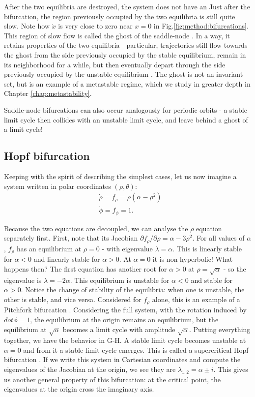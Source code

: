 After the two equilibria are destroyed, the system does not have an
Just after the bifurcation, the region previously occupied by the two equilibria is still quite slow. Note how $\dot{x}$ is very close to zero near $x=0$ in Fig.\ref{fig:method:bifurcations}. This region of slow flow is called the ghost of the saddle-node \cite{strogatz2002nonlinear}. In a way, it retains properties of the two equilibria - particular, trajectories still flow towards the ghost from the side previously occupied by the stable equilibrium, remain in its neighborhood for a while, but then eventually depart through the side previously occupied by the unstable equilibrium \cite{koch2024ghost}. The ghost is not an invariant set, but is an example of a metastable regime, which we study in greater depth in Chapter \ref{chap:metastability}.


Saddle-node bifurcations can also occur analogously for periodic orbits \cite{kuznetsov} - a stable limit cycle then collides with an unstable limit cycle, and leave behind a ghost of a limit cycle!

\subsection{Hopf bifurcation}
Keeping with the spirit of describing the simplest cases, let us now imagine a system written in polar coordinates $(\rho, \theta)$:
% 
\begin{align}
    &\dot{\rho} = f_\rho = \rho(\alpha - \rho^2) \\ 
    &\dot{\phi} = f_\phi = 1.
\end{align}

Because the two equations are decoupled, we can analyse the $\rho$ equation separately first. First, note that its Jacobian $\partial f_\rho / \partial \rho = \alpha - 3\rho^2$. For all values of $\alpha$, $f_\rho$ has an equilibrium at $\rho=0$ - with eigenvalue $\lambda = \alpha$. This is linearly stable for $\alpha<0$ and linearly stable for $\alpha>0$. At $\alpha=0$ it is non-hyperbolic! What happens then? The first equation has another root for $\alpha > 0$ at $\rho = \sqrt{\alpha}$ - so the eigenvalue is $\lambda = -2\alpha$. This equilibrium is unstable for $\alpha < 0$ and stable for $\alpha > 0$. Notice the change of stability of the equilibria: when one is unstable, the other is stable, and vice versa. Considered for $f_\rho$ alone, this is an example of a Pitchfork bifurcation \cite{kuznetsov}. Considering the full system, with the rotation induced by $dot{\phi} = 1$, the equilibrium at the origin remains an equilibrium, but the equilibrium at $\sqrt{\alpha}$ becomes a limit cycle with amplitude $\sqrt{\alpha}$. Putting everything together, we have the behavior in G-H. A stable limit cycle becomes unstable at $\alpha = 0$ and from it a stable limit cycle emerges. This is called a supercritical Hopf bifurcation \cite{kuznetsov}.
If we write this system in Cartesian coordinates and compute the eigenvalues of the Jacobian at the origin, we see they are $\lambda_{1,2} = \alpha \pm i$. This gives us another general property of this bifurcation: at the critical point, the eigenvalues at the origin cross the imaginary axis.

